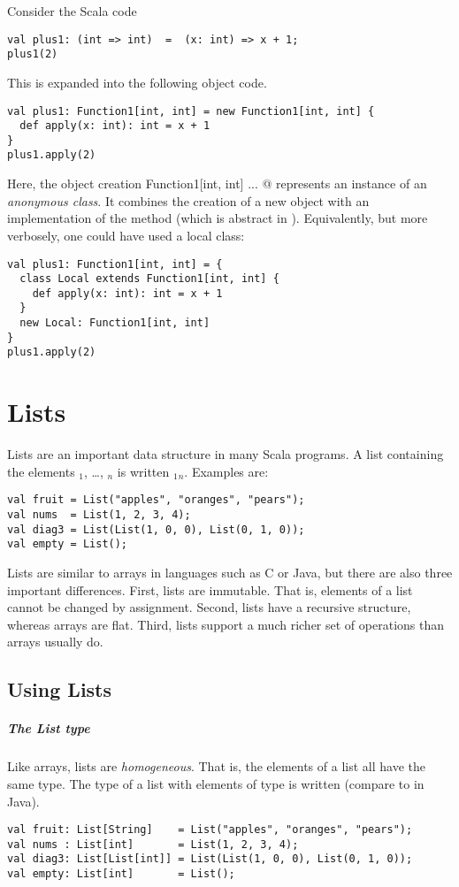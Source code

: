 \example Consider the Scala code
\begin{lstlisting}
val plus1: (int => int)  =  (x: int) => x + 1;
plus1(2)
\end{lstlisting}
This is expanded into the following object code.
\begin{lstlisting}
val plus1: Function1[int, int] = new Function1[int, int] {
  def apply(x: int): int = x + 1
}
plus1.apply(2)
\end{lstlisting}
Here, the object creation \lstinline@new Function1[int, int]{ ... }@
represents an instance of an {\em anonymous class}. It combines the
creation of a new  object with an implementation of 
the  method (which is abstract in ).
Equivalently, but more verbosely, one could have used a local class:
\begin{lstlisting}
val plus1: Function1[int, int] = {
  class Local extends Function1[int, int] {
    def apply(x: int): int = x + 1
  }
  new Local: Function1[int, int]
}
plus1.apply(2)
\end{lstlisting}
 
\chapter{Lists}

Lists are an important data structure in many Scala programs.  
A list containing the elements $_1$, \ldots, $_n$ is written
$_1$$_n$\code{)}. Examples are:
\begin{lstlisting}
val fruit = List("apples", "oranges", "pears");
val nums  = List(1, 2, 3, 4);
val diag3 = List(List(1, 0, 0), List(0, 1, 0));
val empty = List();
\end{lstlisting}
Lists are similar to arrays in languages such as C or Java, but there
are also three important differences. First, lists are immutable. That
is, elements of a list cannot be changed by assignment. Second, 
lists have a recursive structure, whereas arrays are flat. Third,
lists support a much richer set of operations than arrays usually do.

\section{Using Lists}

\paragraph{The List type}
Like arrays, lists are {\em homogeneous}. That is, the elements of a
list all have the same type.  The type of a list with elements of type
 is written  (compare to  in Java).
\begin{lstlisting}
val fruit: List[String]    = List("apples", "oranges", "pears");
val nums : List[int]       = List(1, 2, 3, 4);
val diag3: List[List[int]] = List(List(1, 0, 0), List(0, 1, 0));
val empty: List[int]       = List();
\end{lstlisting}

